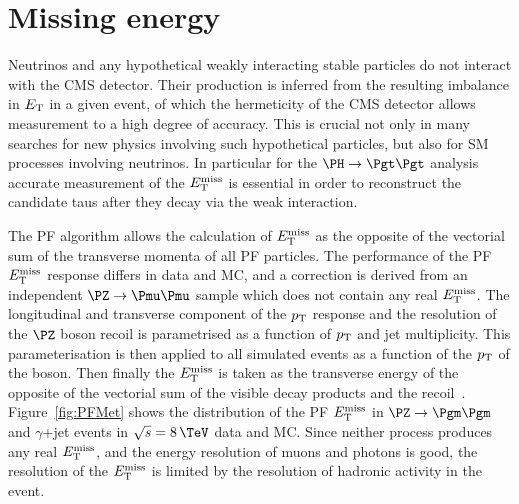 \section{Missing energy}
\label{sec:met}

Neutrinos and any hypothetical weakly interacting stable particles do not
interact with the CMS detector. Their production is inferred from the resulting
imbalance in $E_{\mathrm{T}}$ in a given event, of which the hermeticity of the CMS detector
allows measurement to a high degree of accuracy. This is crucial not only in
many searches for new physics involving such hypothetical particles, but also for
\ac{SM} processes involving neutrinos. In particular for the $\PH \to \Pgt\Pgt$
analysis accurate measurement of the $E_{\mathrm{T}}^{\text{miss}}$ is essential in order to reconstruct the
candidate taus after they decay via the weak interaction.

The \ac{PF} algorithm allows the calculation of $E_{\mathrm{T}}^{\text{miss}}$ as the opposite of the vectorial sum
of the transverse momenta of all \ac{PF} particles. 
The performance of the \ac{PF} $E_{\mathrm{T}}^{\text{miss}}$ response differs in data and
\ac{MC}, and a correction is derived from an independent $\PZ\to\Pmu\Pmu$ sample which
does not contain any real $E_{\mathrm{T}}^{\text{miss}}$. The longitudinal and transverse component of
the $p_{\mathrm{T}}$ response and the resolution of the $\PZ$ boson recoil is parametrised
as a function of $p_{\mathrm{T}}$ and jet multiplicity. This parameterisation is then
applied to all simulated events as a function of the $p_{\mathrm{T}}$ of the boson. Then
finally the $E_{\mathrm{T}}^{\text{miss}}$ is taken as the transverse energy of the opposite of the 
vectorial sum of the visible decay products and the
recoil~\cite{CMS-PAS-JME-12-002}. Figure~\ref{fig:PFMet} shows the distribution
of the \ac{PF} $E_{\mathrm{T}}^{\text{miss}}$ in $\PZ\to\Pgm\Pgm$ and $\gamma$+jet events in
$\sqrt{s}=8\,\TeV$ data and \ac{MC}. Since neither process produces any
real $E_{\mathrm{T}}^{\text{miss}}$, and the energy resolution of muons and photons is good, the
resolution of the $E_{\mathrm{T}}^{\text{miss}}$ is limited by the resolution of hadronic activity in
the event.  

